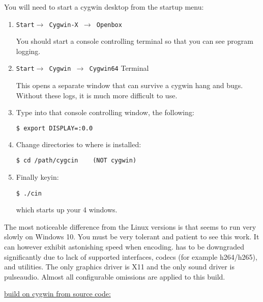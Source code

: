 You will need to start a cygwin desktop from the startup menu:
\begin{enumerate}
	\item \texttt{Start$\rightarrow$ Cygwin-X $\rightarrow$ Openbox}

You should start a console controlling terminal so that you can see program logging.
	\item \texttt{Start$\rightarrow$ Cygwin $\rightarrow$ Cygwin64} Terminal

This opens a separate window that can survive a cygwin hang and bugs. Without these logs, it is much more difficult to use.

	\item Type into that console controlling window, the following:
\begin{lstlisting}[language=bash,numbers=none]
	$ export DISPLAY=:0.0
\end{lstlisting}
	\item Change directories to where \CGG{} is installed:
\begin{lstlisting}[numbers=none]
	$ cd /path/cygcin    (NOT cygwin)
\end{lstlisting}
	\item Finally keyin:
\begin{lstlisting}[numbers=none]
	$ ./cin
\end{lstlisting}
which starts up your 4 \CGG{} windows.
\end{enumerate}

The most noticeable difference from the Linux versions is that \CGG{} seems to run 
very slowly on Windows 10. You must be very tolerant and patient to see this work.  
It can however exhibit astonishing speed when encoding.  \CGG{} has to be downgraded significantly due to lack of supported interfaces, codecs (for example h264/h265), and utilities.  
The only graphics driver is X11 and the only sound driver is pulseaudio.  Almost all configurable
omissions are applied to this build.  

\underline{\CGG{} build on cygwin from source code:}

